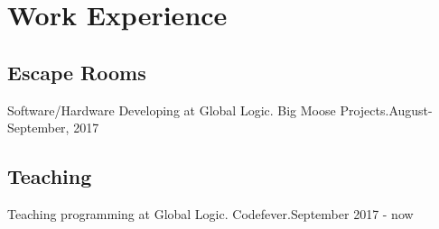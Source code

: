 \section{Work Experie\textcolor{mycolor}{nce}}
  \subsection{Escape Rooms}
    Software/Hardware Developing at {\textcolor{mycolor}{Global Logic}}. Big Moose Projects.{\textcolor{mygrey}{\hspace*{\fill}August-September, 2017}}
  \subsection{Teaching}
    Teaching programming at {\textcolor{mycolor}{Global Logic}}. Codefever.{\textcolor{mygrey}{\hspace*{\fill}September 2017 - now}}